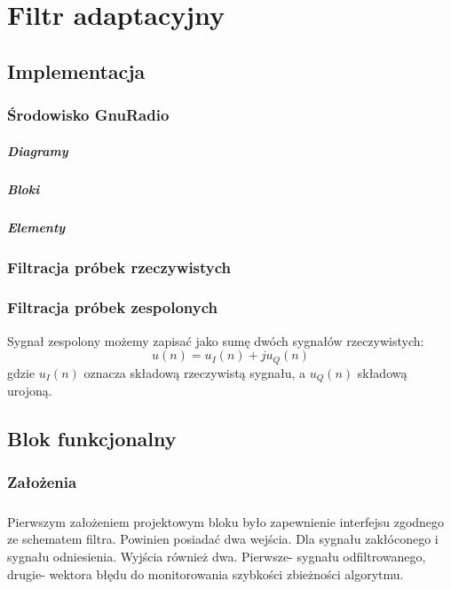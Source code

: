 \chapter{Filtr adaptacyjny}
\section{Implementacja}
\subsection{Środowisko GnuRadio}
\paragraph*{Diagramy}
\paragraph*{Bloki}
\paragraph*{Elementy}
\subsection{Filtracja próbek rzeczywistych}
\subsection{Filtracja próbek zespolonych}
Sygnał zespolony możemy zapisać jako sumę dwóch sygnałów rzeczywistych:
\begin{equation}
u(n) = u_I(n) + ju_Q(n)
\end{equation}
gdzie $u_I(n)$ oznacza składową rzeczywistą sygnału, a $u_Q(n)$ składową urojoną.
\section{Blok funkcjonalny}
\subsection{Założenia}
\paragraph{}
Pierwszym założeniem projektowym bloku było zapewnienie interfejsu zgodnego ze schematem filtra. 
Powinien posiadać dwa wejścia. 
Dla sygnału zakłóconego i sygnału odniesienia. Wyjścia również dwa. 
Pierwsze- sygnału odfiltrowanego, drugie- wektora błędu do monitorowania szybkości zbieżności algorytmu.

